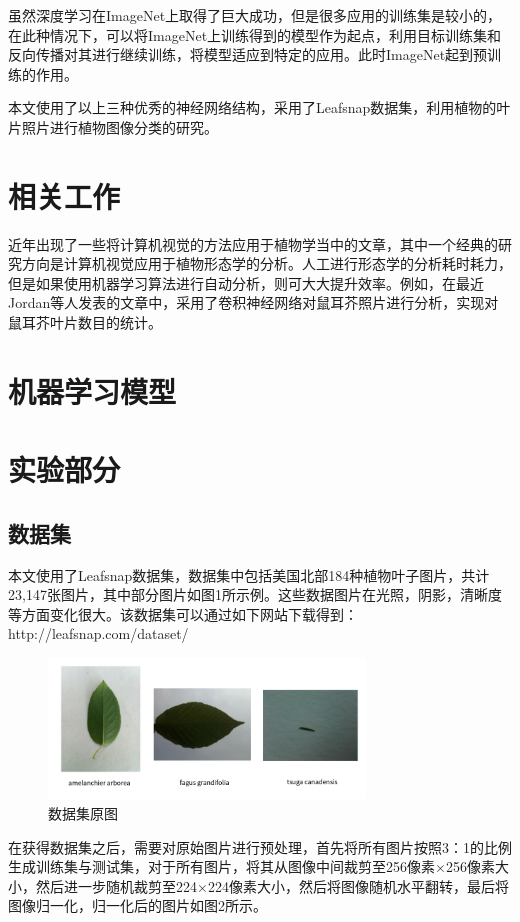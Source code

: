 \documentclass[a4paper]{ctexart} %
\begin{document}
虽然深度学习在ImageNet上取得了巨大成功，但是很多应用的训练集是较小的，在此种情况下，可以将ImageNet上训练得到的模型作为起点，利用目标训练集和反向传播对其进行继续训练，将模型适应到特定的应用。此时ImageNet起到预训练的作用。

本文使用了以上三种优秀的神经网络结构，采用了Leafsnap数据集，利用植物的叶片照片进行植物图像分类的研究。

\section*{相关工作}
近年出现了一些将计算机视觉的方法应用于植物学当中的文章，其中一个经典的研究方向是计算机视觉应用于植物形态学的分析。人工进行形态学的分析耗时耗力，但是如果使用机器学习算法进行自动分析，则可大大提升效率。例如，在最近Jordan等人发表的文章中\parencite{count}，采用了卷积神经网络对鼠耳芥照片进行分析，实现对鼠耳芥叶片数目的统计。
\section*{机器学习模型}

\section*{实验部分}
\subsection*{数据集}
本文使用了Leafsnap\parencite{leafsnap}数据集，数据集中包括美国北部184种植物叶子图片，共计23,147张图片，其中部分图片如图1所示例。这些数据图片在光照，阴影，清晰度等方面变化很大。该数据集可以通过如下网站下载得到：http://leafsnap.com/dataset/
\begin{figure}[htbp]
	\centering
	\includegraphics[width=0.75\textwidth]{img1.png}
	\caption{数据集原图}
	\label{figure}
\end{figure}


在获得数据集之后，需要对原始图片进行预处理，首先将所有图片按照3：1的比例生成训练集与测试集，对于所有图片，将其从图像中间裁剪至256像素×256像素大小，然后进一步随机裁剪至224×224像素大小，然后将图像随机水平翻转，最后将图像归一化，归一化后的图片如图2所示。
\end{document}
